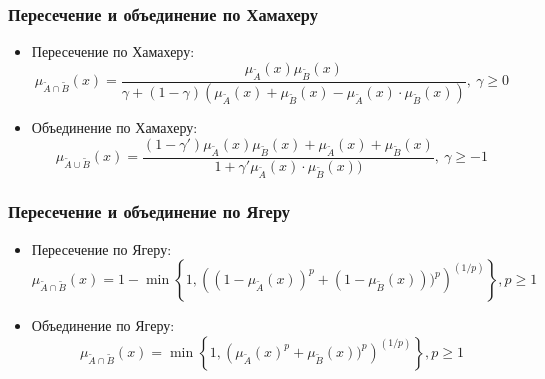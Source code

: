 \documentclass{beamer}
\begin{document}
\begin{frame}\frametitle{Пересечение и объединение по Хамахеру}

    \begin{itemize}
        \item Пересечение по Хамахеру:
        \[
            \mu_{\tilde{A} \cap \tilde{B}}(x) = \frac{\mu_{\tilde{A}}(x) \mu_{\tilde{B}}(x)}{\gamma + (1-\gamma)(\mu_{\tilde{A}}(x) + \mu_{\tilde{B}}(x) - \mu_{\tilde{A}}(x) \cdot \mu_{\tilde{B}}(x))},\ \gamma \geq 0
        \]
        \item Объединение по Хамахеру:
        \[
            \mu_{\tilde{A} \cup \tilde{B}}(x) = \frac{(1-\gamma')\mu_{\tilde{A}}(x) \mu_{\tilde{B}}(x) + \mu_{\tilde{A}}(x) + \mu_{\tilde{B}}(x)}{1 + \gamma' \mu_{\tilde{A}}(x) \cdot \mu_{\tilde{B}}(x))},\ \gamma \geq -1
        \]
    \end{itemize}
    
\end{frame}

\begin{frame}\frametitle{Пересечение и объединение по Ягеру}

    \begin{itemize}
        \item Пересечение по Ягеру:
        \[
            \mu_{\tilde{A} \cap \tilde{B}}(x) = 1 - \min{ \left\{ 1, \left( (1 - \mu_{\tilde{A}}(x))^p + (1 - \mu_{\tilde{B}}(x)))^p \right)^(1/p) \right\}}, p \geq 1
        \]
        \item Объединение по Ягеру:
        \[
            \mu_{\tilde{A} \cap \tilde{B}}(x) = \min{ \left\{ 1, \left( \mu_{\tilde{A}}(x)^p + \mu_{\tilde{B}}(x))^p \right)^(1/p) \right\}}, p \geq 1
        \]
    \end{itemize}
    
\end{frame}
\end{document}

